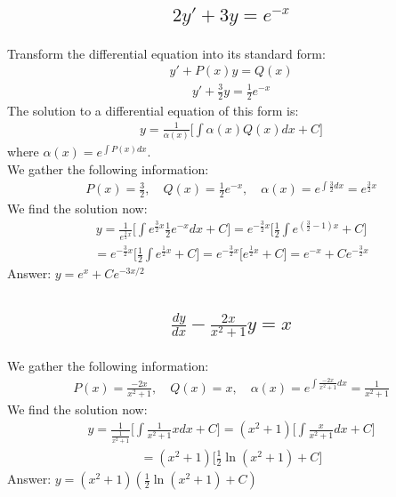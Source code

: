 \documentclass{article}
\begin{document}
\subsection{
	\begin{align*}
		2y' + 3y = e^{-x}
	\end{align*}
}
Transform the differential equation into its standard form:
\begin{align*}
	y' + P(x)y = Q(x)
\end{align*}
\begin{align*}
	y' + \frac{3}{2}y = \frac{1}{2}e^{-x}
\end{align*}
The solution to a differential equation of this form is:
\begin{align*}
	y = \frac{1}{\alpha(x)} \bigg[ \int{\alpha(x) Q(x) dx} + C \bigg]
\end{align*}
where $\alpha(x) = e^{\int{P(x)dx}}$. \\[10pt]
We gather the following information:
\begin{align*}
	P(x) = \frac{3}{2}, \quad Q(x) = \frac{1}{2}e^{-x}, \quad \alpha(x) = e^{\int{\frac{3}{2}dx}} = e^{\frac{3}{2}x}
\end{align*}
We find the solution now:
\begin{align*}
	y = \frac{1}{e^{\frac{3}{2}x}} \bigg[ \int{e^{\frac{3}{2}x}} \frac{1}{2}e^{-x}dx + C \bigg] = e^{-\frac{3}{2}x} \bigg[ \frac{1}{2} \int{e^{(\frac{3}{2} - 1)x}} + C \bigg]
\end{align*}
\begin{align*}
	= e^{-\frac{3}{2}x} \bigg[ \frac{1}{2} \int{e^{\frac{1}{2}x}} + C \bigg] = e^{-\frac{3}{2}x} \bigg[ e^{\frac{1}{2}x} + C \bigg] = e^{-x} + Ce^{-\frac{3}{2}x}
\end{align*}
Answer: $y = e^x + Ce^{-3x/2}$

\subsection{
	\begin{align*}
		\frac{dy}{dx} - \frac{2x}{x^2 + 1}y = x
	\end{align*}
}
We gather the following information:
\begin{align*}
	P(x) = \frac{-2x}{x^2 + 1}, \quad Q(x) = x, \quad \alpha(x) = e^{\int{\frac{-2x}{x^2 + 1}dx}} = \frac{1}{x^2 + 1}
\end{align*}
We find the solution now:
\begin{align*}
	y = \frac{1}{\frac{1}{x^2 + 1}} \bigg[ \int{\frac{1}{x^2 + 1}x dx} + C \bigg] = (x^2 + 1) \bigg[ \int{\frac{x}{x^2 + 1}dx} + C \bigg]
\end{align*}
\begin{align*}
	= (x^2 + 1) \bigg[ \frac{1}{2}\ln{(x^2 + 1)} + C \bigg]
\end{align*}
Answer: $y = (x^2 + 1) ( \frac{1}{2} \ln{(x^2 + 1)} + C ) $
\end{document}
